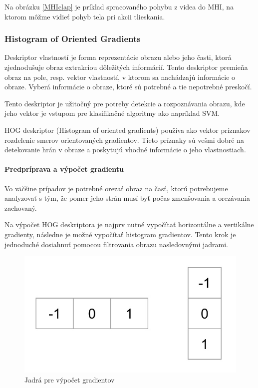 Na obrázku \ref{MHIclap} je príklad spracovaného pohybu z videa do MHI, na ktorom môžme vidieť pohyb tela pri akcii tlieskania.

\subsubsection{Histogram of Oriented Gradients} \label{HOGlabel}
Deskriptor vlastností je forma reprezentácie obrazu alebo jeho časti, ktorá zjednodušuje obraz extrakciou dôležitých informácií. Tento deskriptor premieňa obraz na pole, resp. vektor vlastností, v ktorom sa nachádzajú informácie o obraze. Vyberá informácie o obraze, ktoré sú potrebné a tie nepotrebné preskočí. 

Tento deskriptor je užitočný  pre potreby detekcie a rozpoznávania obrazu, kde jeho vektor je vstupom pre klasifikačné algoritmy ako napríklad SVM. 

HOG deskriptor (Histogram of oriented gradients) používa ako vektor príznakov rozdelenie smerov orientovaných gradientov. Tieto príznaky sú vešmi dobré na detekovanie hrán v obraze a poskytujú vhodné informácie o jeho vlastnostiach.

\paragraph{Predpríprava a výpočet gradientu}

Vo väčšine prípadov je potrebné orezať obraz na časť, ktorú potrebujeme analyzovať s tým, že pomer jeho strán musí byť počas zmenšovania a orezávania zachovaný. 

Na výpočet HOG deskriptora je najprv nutné vypočítať horizontálne a vertikálne gradienty, následne je možné vypočítať histogram gradientov. Tento krok je jednoduché dosiahnuť pomocou filtrovania obrazu nasledovnými jadrami.

\begin{figure}[H]
  \centering
  \includegraphics[width=12cm]{img/HOGkern.png}
  \caption{Jadrá pre výpočet gradientov \cite{c20}}
  \label{HOGkern}
\end{figure}

